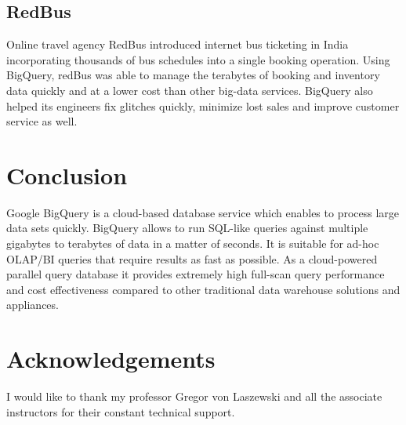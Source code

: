 \documentclass[9pt,twocolumn,twoside]{../../styles/osajnl}
\begin{document}
\subsection{RedBus}
Online travel agency RedBus\cite{www-usecase-redbus} introduced
internet bus ticketing in India incorporating thousands of bus
schedules into a single booking operation. Using BigQuery, redBus was
able to manage the terabytes of booking and inventory data quickly and
at a lower cost than other big-data services. BigQuery also helped its
engineers fix glitches quickly, minimize lost sales and improve
customer service as well.

\section{Conclusion}
Google BigQuery is a cloud-based database service which enables to
process large data sets quickly. BigQuery allows to run SQL-like
queries against multiple gigabytes to terabytes of data in a matter of
seconds. It is suitable for ad-hoc OLAP/BI\cite{www-olap} queries that
require results as fast as possible. As a cloud-powered parallel query
database it provides extremely high full-scan query performance and
cost effectiveness compared to other traditional data warehouse
solutions and appliances.

\section*{Acknowledgements}

I would like to thank my professor Gregor von Laszewski and all the
associate instructors for their constant technical support.



 
\newpage

\appendix
\end{document}
